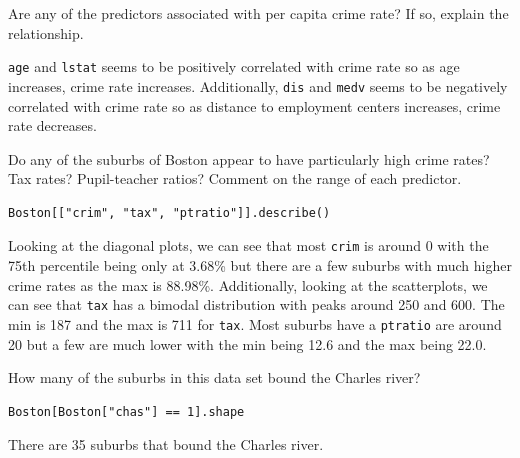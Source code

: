 \documentclass{article}
\begin{document}
\begin{probset}
\begin{prob}
\begin{subprobset}
        \newpage

        \begin{subprob}
            Are any of the predictors associated with per capita crime rate? If so, explain the relationship.

            \begin{soln}
                \texttt{age} and \texttt{lstat} seems to be positively correlated with crime rate so as age increases, crime rate increases. Additionally, \texttt{dis} and \texttt{medv} seems to be negatively correlated with crime rate so as distance to employment centers increases, crime rate decreases.
            \end{soln}
        \end{subprob}

        \begin{subprob}
            Do any of the suburbs of Boston appear to have particularly high crime rates? Tax rates? Pupil-teacher ratios? Comment on the range of each predictor.

            \begin{verbatim}
Boston[["crim", "tax", "ptratio"]].describe()
            \end{verbatim}

            \begin{soln}
                Looking at the diagonal plots, we can see that most \texttt{crim} is around 0 with the 75th percentile being only at 3.68\% but there are a few suburbs with much higher crime rates as the max is 88.98\%. Additionally, looking at the scatterplots, we can see that \texttt{tax} has a bimodal distribution with peaks around 250 and 600. The min is 187 and the max is 711 for \texttt{tax}. Most suburbs have a \texttt{ptratio} are around 20 but a few are much lower with the min being 12.6 and the max being 22.0.
            \end{soln}
        \end{subprob}

        \begin{subprob}
            How many of the suburbs in this data set bound the Charles river?

            \begin{verbatim}
Boston[Boston["chas"] == 1].shape
            \end{verbatim}

            \begin{soln}
                There are 35 suburbs that bound the Charles river.
            \end{soln}
        \end{subprob}


\end{subprobset}
\end{prob}
\end{probset}
\end{document}
